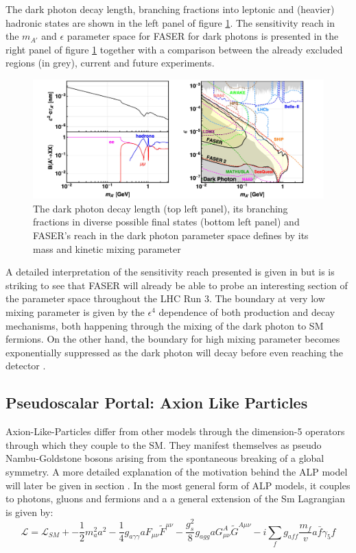 		The dark photon decay length, branching fractions into leptonic and (heavier) hadronic states are shown in the left panel of figure \ref{im:dark_photon_prod}. The sensitivity reach in the $m_{A'}$ and $\epsilon$ parameter space for FASER for dark photons is presented in the right panel of figure \ref{im:dark_photon_prod} together with a comparison between the already excluded regions (in grey), current and future experiments.
		\clearpage
		\begin{figure}[h]
			\centering
			\includegraphics[width=0.95\linewidth]{files/dark_photon_production}
			\caption{The dark photon decay length (top left panel), its branching fractions in diverse possible final states (bottom left panel) and FASER's reach in the dark photon parameter space defines by its mass and kinetic mixing parameter}
			\label{im:dark_photon_prod}
		\end{figure}
		
		A detailed interpretation of the sensitivity reach presented is given in \cite{FASER_LLP} but is is striking to see that FASER will already be able to probe an interesting section of the parameter space throughout the LHC Run 3. The boundary at very low mixing parameter is given by the $\epsilon^4$ dependence of both production and decay mechanisms, both happening through the mixing of the dark photon to SM fermions. On the other hand, the boundary for high mixing parameter becomes exponentially suppressed as the dark photon will decay before even reaching the detector \cite{FASER_LLP}.  
		
		
		\subsection{Pseudoscalar Portal: Axion Like Particles}
		
		Axion-Like-Particles differ from other models through the dimension-5 operators through which they couple to the SM. They manifest themselves as pseudo Nambu-Goldstone bosons arising from the spontaneous breaking of a global symmetry. A more detailed explanation of the motivation behind the ALP model will later be given in section . In the most general form of ALP models, it couples to photons, gluons and fermions and a a general extension of the Sm Lagrangian is given by: 
		\begin{equation}
			\mathcal{L} = \mathcal{L}_{SM} + -\frac{1}{2} m_a^2 a^2 - \frac{1}{4} g_{a\gamma\gamma} a F_{\mu\nu} \tilde{F}^{\mu\nu} - \frac{g_s^2}{8} g_{agg} a G_{\mu\nu}^A \tilde{G}^{A\mu\nu} - i \sum_f g_{aff} \frac{m_f}{v} a \bar{f} \gamma_5 f
		\end{equation}
		
